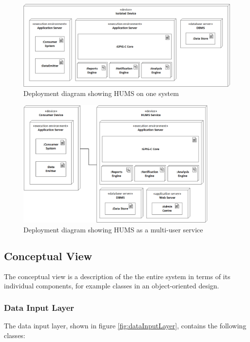 \documentclass[10pt,a4paper]{article}
\begin{document}
\begin{figure}[!ht]
  \centering
  \includegraphics[width=12.5cm]{images/DeploymentIsolated.png}
  \caption{Deployment diagram showing HUMS on one system}
  \label{fig:DeploymentIsolated}
\end{figure}

%
%
\begin{figure}[!ht]
  \centering
  \includegraphics[width=10cm]{images/DeploymentService.png}
  \caption{Deployment diagram showing HUMS as a multi-user service}
  \label{fig:DeploymentService}
\end{figure}

\subsection{Conceptual View}
The conceptual view is a description of the the entire system in terms of its individual components, for example classes in an object-oriented design.

\subsubsection{Data Input Layer}

The data input layer, shown in figure \ref{fig:dataInputLayer},
contains the following classes:
\end{document}
